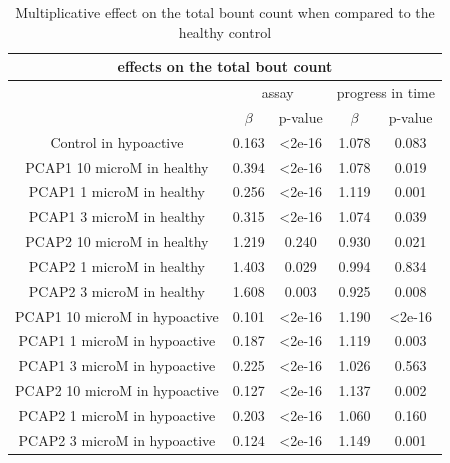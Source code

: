 \documentclass[a4paper,12pt]{article}
\begin{document}
\begin{table}[h!]\tiny
\centering
\begin{tabular}{|c|c|c|c|c|}
\hline
\multicolumn{5}{|c|}{effects on the total bout count}                              \\ \hline
                                   & \multicolumn{2}{c|}{assay} & \multicolumn{2}{c|}{progress in time} \\ \cline{2-5}
                                   &  $\beta$            & p-value      &      $\beta$              & p-value           \\ \hline
Control in hypoactive                & 0.163      & \textless2e-16        & 1.078             & 0.083             \\ \hline
PCAP1 10 microM in healthy           & 0.394      & \textless2e-16       & 1.078             & 0.019             \\ \hline
PCAP1 1 microM in healthy            & 0.256      & \textless2e-16        & 1.119             & 0.001             \\ \hline
PCAP1 3 microM in healthy            & 0.315      & \textless2e-16        & 1.074             & 0.039             \\ \hline
PCAP2 10 microM in healthy           & 1.219       & 0.240        & 0.930            & 0.021             \\ \hline
PCAP2 1 microM in healthy            & 1.403       & 0.029        & 0.994            & 0.834             \\ \hline
PCAP2 3 microM in healthy            & 1.608       & 0.003        & 0.925            & 0.008             \\ \hline
PCAP1 10 microM in hypoactive        & 0.101      & \textless2e-16        & 1.190             & \textless2e-16             \\ \hline
PCAP1 1 microM in hypoactive         & 0.187      & \textless2e-16        & 1.119             & 0.003             \\ \hline
PCAP1 3 microM in hypoactive         & 0.225      & \textless2e-16        & 1.026             & 0.563             \\ \hline
PCAP2 10 microM in hypoactive        & 0.127      & \textless2e-16        & 1.137             & 0.002             \\ \hline
PCAP2 1 microM in hypoactive         & 0.203      & \textless2e-16        & 1.060             & 0.160             \\ \hline
PCAP2 3 microM in hypoactive         & 0.124      & \textless2e-16        & 1.149             & 0.001             \\ \hline
\end{tabular}
\caption{Multiplicative effect on the total bount count when compared to the healthy control}
\end{table}
\end{document}
